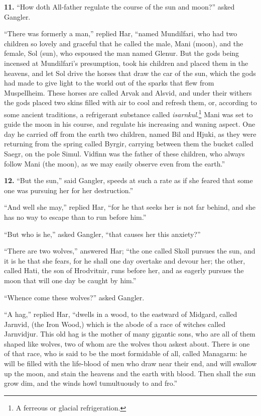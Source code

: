 
\textbf{11.} ``How doth All-father regulate the course of the sun and moon?''
asked Gangler.

``There was formerly a man,'' replied Har, ``named Mundilfari, who had
two children so lovely and graceful that he called the male, Mani
(moon), and the female, Sol (sun), who espoused the man named Glenur.
But the gods being incensed at Mundilfari's presumption, took his
children and placed them in the heavens, and let Sol drive the horses
that draw the car of the sun, which the gods had made to give light to
the world out of the sparks that flew from Muspellheim. These horses
are called Arvak and Alsvid, and under their withers the gods placed
two skins filled with air to cool and refresh them, or, according to
some ancient traditions, a refrigerant substance called
\emph{isarnkul}.\footnote{A ferreous or glacial refrigeration.} Mani was set to guide the moon in his course, and
regulate his increasing and waning aspect. One day he carried off from
the earth two children, named Bil and Hjuki, as they were returning
from the spring called Byrgir, carrying between them the bucket called
Saegr, on the pole Simul. Vidfinn was the father of these children,
who always follow Mani (the moon), as we may easily observe even from
the earth.''


\textbf{12.} ``But the sun,'' said Gangler, speeds at such a rate as if she
feared that some one was pursuing her for her destruction.''

``And well she may,'' replied Har, ``for he that seeks her is not far
behind, and she has no way to escape than to run before him.''

``But who is he,'' asked Gangler, ``that causes her this anxiety?''

``There are two wolves,'' answered Har; ``the one called Skoll pursues
the sun, and it is he that she fears, for he shall one day overtake
and devour her; the other, called Hati, the son of Hrodvitnir, runs
before her, and as eagerly pursues the moon that will one day be
caught by him.''

``Whence come these wolves?'' asked Gangler.

``A hag,'' replied Har, ``dwells in a wood, to the eastward of Midgard,
called Jarnvid, (the Iron Wood,) which is the abode of a race of
witches called Jarnvidjur. This old hag is the mother of many gigantic
sons, who are all of them shaped like wolves, two of whom are the
wolves thou askest about. There is one of that race, who is said to be
the most formidable of all, called Managarm: he will be filled with
the life-blood of men who draw near their end, and will swallow up the
moon, and stain the heavens and the earth with blood. Then shall the
sun grow dim, and the winds howl tumultuously to and fro.''

